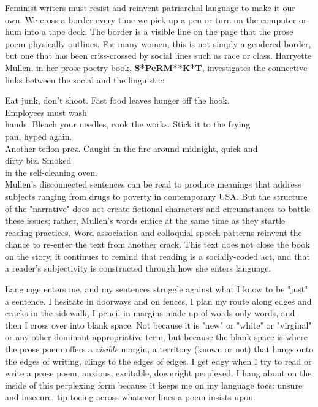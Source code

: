 Feminist writers must resist and reinvent patriarchal language to make
it our own. We cross a border every time we pick up a pen or turn on the
computer or hum into a tape deck. The border is a visible line on the
page that the prose poem physically outlines. For many women, this is
not simply a gendered border, but one that has been criss-crossed by
social lines such as race or class. Harryette Mullen, in her prose
poetry book, \textbf{S*PeRM**K*T}, investigates the connective links
between the social and the linguistic:

Eat junk, don't shoot. Fast food leaves hunger off the hook.\\
Employees must wash\\
hands. Bleach your needles, cook the works. Stick it to the frying\\
pan, hyped again.\\
Another teflon prez. Caught in the fire around midnight, quick and\\
dirty biz. Smoked\\
in the self-cleaning oven.\\

Mullen's disconnected sentences can be read to produce meanings that
address subjects ranging from drugs to poverty in contemporary USA. But
the structure of the "narrative" does not create fictional characters
and circumstances to battle these issues; rather, Mullen's words entice
at the same time as they startle reading practices. Word association and
colloquial speech patterns reinvent the chance to re-enter the text from
another crack. This text does not close the book on the story, it
continues to remind that reading is a socially-coded act, and that a
reader's subjectivity is constructed through how she enters language.

Language enters me, and my sentences struggle against what I know to be
"just" a sentence. I hesitate in doorways and on fences, I plan my route
along edges and cracks in the sidewalk, I pencil in margins made up of
words only words, and then I cross over into blank space. Not because it
is "new" or "white" or "virginal" or any other dominant appropriative
term, but because the blank space is where the prose poem offers a
\emph{visible} margin, a territory (known or not) that hangs onto the
edges of writing, clings to the edges of edges. I get edgy when I try to
read or write a prose poem, anxious, excitable, downright perplexed. I
hang about on the inside of this perplexing form because it keeps me on
my language toes: unsure and insecure, tip-toeing across whatever lines
a poem insists upon.


